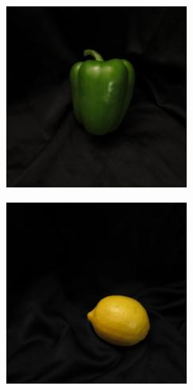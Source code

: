\documentclass[final]{beamer}
\newlength{\onecolwid}
\begin{document}
\begin{frame}[t]
\begin{columns}[t]
\begin{column}{\onecolwid}
\begin{figure}
\begin{subfigure}{.123\textwidth}
\end{subfigure}%
 \begin{subfigure}{.123\textwidth}
  \centering
\includegraphics[width=\textwidth]{3_5.jpg}
\end{subfigure}%
  \begin{subfigure}{.123\textwidth}
  \centering
\includegraphics[width=\textwidth]{3_17.jpg}

\end{subfigure}
\end{figure}
\end{column}
\end{columns}
\end{frame}
\end{document}
